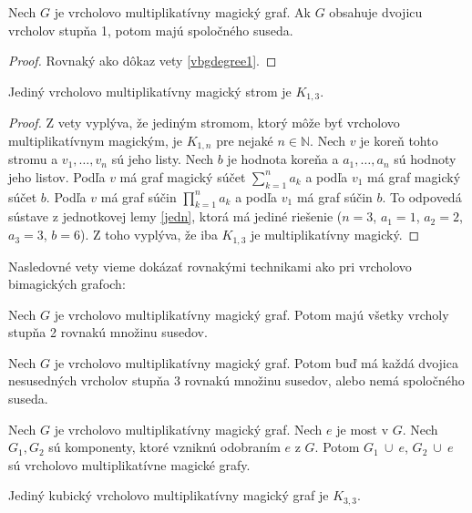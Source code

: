 \begin{theorem}
\label{vmmgdegree1}
Nech $G$ je vrcholovo multiplikatívny magický graf. Ak $G$ obsahuje dvojicu vrcholov stupňa 1, potom majú spoločného suseda.
\end{theorem}

\begin{proof} Rovnaký ako dôkaz vety \ref{vbgdegree1}.
\end{proof}

\begin{consequence} Jediný vrcholovo multiplikatívny magický strom je $K_{1,3}$.
\end{consequence}

\begin{proof} Z vety \label{vmmgdegree1} vyplýva, že jediným stromom, ktorý môže byť vrcholovo multiplikatívnym magickým, je $K_{1,n}$ pre nejaké $n \in \mathbb{N}$. Nech $v$ je koreň tohto stromu a $v_1, \dots , v_n$ sú jeho listy. Nech $b$ je hodnota koreňa a $a_1, \dots , a_n$ sú hodnoty jeho listov. Podľa $v$ má graf magický súčet $\sum_{k=1}^{n} a_k$ a podľa $v_1$ má graf magický súčet $b$. Podľa $v$ má graf súčin $\prod_{k=1}^{n} a_k$ a podľa $v_1$ má graf súčin $b$. To odpovedá sústave z jednotkovej lemy \ref{jedn}, ktorá má jediné riešenie ($n = 3$, $a_1 = 1$, $a_2 = 2$, $a_3 = 3$, $b = 6$). Z toho vyplýva, že iba $K_{1,3}$ je multiplikatívny magický.
\end{proof}

Nasledovné vety vieme dokázať rovnakými technikami ako pri vrcholovo bimagických grafoch:

\begin{theorem} Nech $G$ je vrcholovo multiplikatívny magický graf. Potom majú všetky vrcholy stupňa 2 rovnakú množinu susedov.
\end{theorem}

\begin{theorem} Nech $G$ je vrcholovo multiplikatívny magický graf. Potom buď má každá dvojica nesusedných vrcholov stupňa 3 rovnakú množinu susedov, alebo nemá spoločného suseda.
\end{theorem}

\begin{theorem} Nech $G$ je vrcholovo multiplikatívny magický graf. Nech $e$ je most v $G$. Nech $G_1, G_2$ sú komponenty, ktoré vzniknú odobraním $e$ z $G$. Potom $G_1 ~\cup~ e$, $G_2 ~\cup~ e$ sú vrcholovo multiplikatívne magické grafy. 
\end{theorem}

\begin{theorem} Jediný kubický vrcholovo multiplikatívny magický graf je $K_{3,3}$.
\end{theorem}

